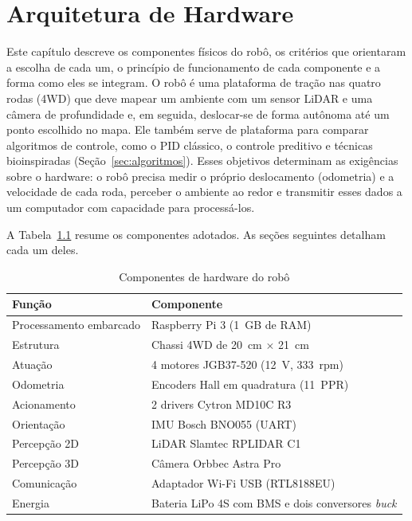 \chapter[Arquitetura de Hardware]{Arquitetura de Hardware}
\label{cap:hardware}

Este capítulo descreve os componentes físicos do robô, os critérios que
orientaram a escolha de cada um, o princípio de funcionamento de cada
componente e a forma como eles se integram. O robô é uma plataforma de
tração nas quatro rodas (4WD) que deve mapear um ambiente com um sensor
LiDAR e uma câmera de profundidade e, em seguida, deslocar-se de forma
autônoma até um ponto escolhido no mapa. Ele também serve de plataforma
para comparar algoritmos de controle, como o PID clássico, o controle
preditivo e técnicas bioinspiradas (Seção~\ref{sec:algoritmos}). Esses
objetivos determinam as exigências sobre o hardware: o robô precisa medir
o próprio deslocamento (odometria) e a velocidade de cada roda, perceber
o ambiente ao redor e transmitir esses dados a um computador com
capacidade para processá-los.

A Tabela~\ref{tab:componentes} resume os componentes adotados. As seções
seguintes detalham cada um deles.

\begin{table}[htb]
	\centering
	\caption{Componentes de hardware do robô}
	\label{tab:componentes}
	\begin{tabular}{|l|l|}
		\hline
		\textbf{Função} & \textbf{Componente} \\ \hline
		Processamento embarcado & Raspberry Pi 3 (1~GB de RAM) \\ \hline
		Estrutura & Chassi 4WD de 20~cm $\times$ 21~cm \\ \hline
		Atuação & 4 motores JGB37-520 (12~V, 333~rpm) \\ \hline
		Odometria & Encoders Hall em quadratura (11~PPR) \\ \hline
		Acionamento & 2 drivers Cytron MD10C R3 \\ \hline
		Orientação & IMU Bosch BNO055 (UART) \\ \hline
		Percepção 2D & LiDAR Slamtec RPLIDAR C1 \\ \hline
		Percepção 3D & Câmera Orbbec Astra Pro \\ \hline
		Comunicação & Adaptador Wi-Fi USB (RTL8188EU) \\ \hline
		Energia & Bateria LiPo 4S com BMS e dois conversores \textit{buck} \\ \hline
	\end{tabular}
\end{table}

